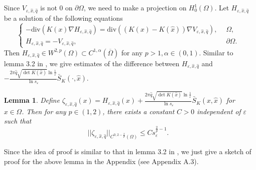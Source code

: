\documentclass[12pt,reqno]{amsart}
\numberwithin{equation}{section}
\newtheorem{lemma}[theorem]{Lemma}
\theoremstyle{definition}
\theoremstyle{remark}
\begin{document}
Since $ V_{\varepsilon, \hat{x}, \hat{q}} $ is not 0 on $ \partial \Omega $, we need to make a projection on $ H^1_0(\Omega). $ %
Let $ H_{\varepsilon, \hat{x}, \hat{q}} $ be a solution of the following equations
\begin{equation}\label{eq3}
\begin{cases}
-\text{div}\left (K(x)\nabla H_{\varepsilon, \hat{x}, \hat{q}}\right )=\text{div}\left (\left (K(x)-K(\hat{x})\right )\nabla V_{\varepsilon, \hat{x}, \hat{q}}\right ),\ \ &\Omega,\\
H_{\varepsilon, \hat{x}, \hat{q}}=-V_{\varepsilon, \hat{x}, \hat{q}},\ \ &\partial\Omega.
\end{cases}
\end{equation}
Then  $ H_{\varepsilon, \hat{x}, \hat{q}}\in W^{2,p}(\Omega)\subset  C^{1,\alpha}(\overline{\Omega}) $ for any $ p>1, \alpha\in(0,1) $. Similar to lemma 3.2 in \cite{CW}, we give estimates of the difference between $ H_{\varepsilon, \hat{x}, \hat{q}} $ and  $ -\frac{2\pi\hat{q}\sqrt{\det K(\hat{x})}\ln\frac{1}{\varepsilon}}{\ln s_\varepsilon}\bar{S}_K(\cdot,\hat{x}) $.

\begin{lemma}\label{H estimate}
Define $ \zeta_{\varepsilon, \hat{x}, \hat{q}}(x)=H_{\varepsilon, \hat{x}, \hat{q}}(x)+\frac{2\pi\hat{q}\sqrt{\det K(\hat{x})}\ln\frac{1}{\varepsilon}}{\ln s_\varepsilon}\bar{S}_K(x,\hat{x}) $ for $ x\in\Omega $. Then for any $ p\in(1,2) $, there exists a constant $ C>0 $ independent of $ \varepsilon $ such that
\begin{equation*}
||\zeta_{\varepsilon, \hat{x}, \hat{q}}||_{C^{0,2-\frac{2}{p}}(\Omega)}\leq Cs_\varepsilon^{\frac{2}{p}-1}.
\end{equation*}
\end{lemma}
Since the idea of proof is similar to that in lemma 3.2 in \cite{CW}, we just give a sketch of   proof for the above lemma   in the Appendix (see Appendix A.3).
\end{document}
